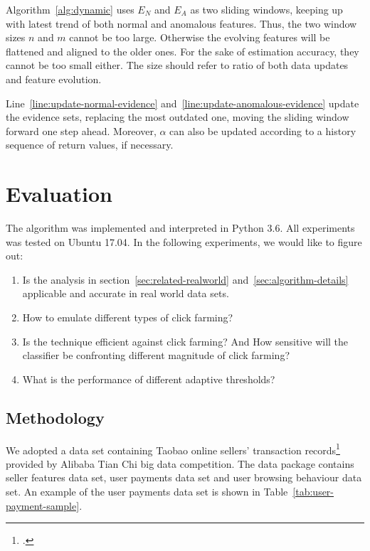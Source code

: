 \documentclass[a4paper]{IEEEtran}
\begin{document}
			Algorithm~\ref{alg:dynamic} uses $E_N$ and $E_A$ as two sliding windows, keeping up with latest trend of both normal and anomalous features. Thus, the two window sizes $n$ and $m$ cannot be too large. Otherwise the evolving features will be flattened and aligned to the older ones. For the sake of estimation accuracy, they cannot be too small either. The size should refer to ratio of both data updates and feature evolution.
			
			Line~\ref{line:update-normal-evidence} and~\ref{line:update-anomalous-evidence} update the evidence sets, replacing the most outdated one, moving the sliding window forward one step ahead. Moreover, $\alpha$ can also be updated according to a history sequence of return values, if necessary.
	
	\section{Evaluation}\label{sec:evaluation}
		The algorithm was implemented and interpreted in Python 3.6. All experiments was tested on Ubuntu 17.04. In the following experiments, we would like to figure out:
		
		\begin{enumerate}
			\item Is the analysis in section~\ref{sec:related-realworld} and~\ref{sec:algorithm-details} applicable and accurate in real world data sets.
			\item How to emulate different types of click farming?
			\item Is the technique efficient against click farming? And How sensitive will the classifier be confronting different magnitude of click farming?
			\item What is the performance of different adaptive thresholds?
		\end{enumerate}
		
		\subsection{Methodology}\label{sec:exp-methodology}
			We adopted a data set containing Taobao online sellers' transaction records\footcite{https://tianchi.aliyun.com/competition/information.htm?raceId=231591} provided by Alibaba Tian Chi big data competition. The data package contains seller features data set, user payments data set and user browsing behaviour data set. An example of the user payments data set is shown in Table~\ref{tab:user-payment-sample}.
			
\end{document}
